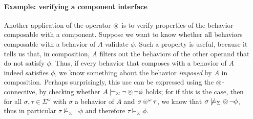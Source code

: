 \documentclass[a4paper]{article}
\newcommand{\composable}{\mathop{\ocircle}\nolimits}
\theoremstyle{definition}
\newcommand{\charge}{\mathsf{charge}}
\newcommand{\pass}{\mathsf{pass}}
\newcommand{\e}{\mathsf{e}}
\newcommand{\nxt}{\mathop{X}\nolimits}
\newcommand{\always}{\mathop{\Box}}
\renewcommand{\implies}{\mathop{\rightarrow}}
\begin{document}

\paragraph{Example: verifying a component interface}
Another application of the operator $\composable$ is to verify properties of the behavior composable with a component. Suppose we want to know whether all behaviors composable with a behavior of $A$ validate $\phi$. Such a property is useful, because it tells us that, in composition, $A$ filters out the behaviors of the other operand that do not satisfy $\phi$. Thus, if every behavior that composes with a behavior of $A$ indeed satisfies $\phi$, we know something about the behavior \emph{imposed} by $A$ in composition. Perhaps surprisingly, this use can be expressed using the $\composable$-connective, by checking whether $A \models_\Sigma \neg \composable \neg \phi$ holds; for if this is the case, then for all $\sigma, \tau \in \Sigma^\omega$ with $\sigma$ a behavior of $A$ and $\sigma \composable^\omega \tau$, we know that $\sigma \not\models_\Sigma \composable \neg \phi$, thus in particular $\tau \not\models_\Sigma \neg \phi$ and therefore $\tau \models_{\Sigma} \phi$.
\end{document}
